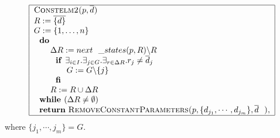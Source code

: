 \[
\begin{tabular}{|l|}
\hline
\textsc{Constelm2(}$p,\overline{d}$\textsc{)} \\ 
$R:=\overline{\{d\}}$ \\ 
$G:=\{1,\ldots ,n\}$ \\ 
$\text{\textbf{do}}$ \\ 
$\qquad \Delta R:=next\_states(p,R)\backslash R$ \\ 
$\qquad \text{\textbf{if }}\exists _{i\in I}.\exists _{j\in G}.\exists
_{r\in \Delta R}.r_{j}\neq \overline{d}_{j}$ \\ 
$\qquad \qquad G:=G\backslash \{j\}$ \\ 
$\qquad \text{\textbf{fi}}$ \\ 
$\qquad R:=R\cup \Delta R$ \\ 
$\text{\textbf{while }}(\Delta R\neq \emptyset )$ \\ 
$\text{\textbf{return} \textsc{RemoveConstantParameters(}}%
p,\{d_{j_{1}},\cdots ,d_{j_{m}}\},\overline{d}\text{\textsc{)}},$ \\ \hline
\end{tabular}%
\]%
where $\{j_{1},\cdots ,j_{m}\}=G$.\newpage
